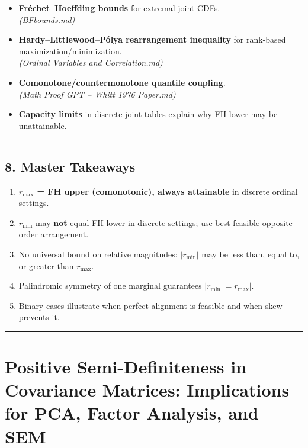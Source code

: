 \documentclass[
  letterpaper,
  DIV=11,
  numbers=noendperiod]{scrartcl}
\providecommand{\tightlist}{%
  \setlength{\itemsep}{0pt}\setlength{\parskip}{0pt}}
\theoremstyle{remark}
\begin{document}
\begin{itemize}
\tightlist
\item
  \textbf{Fréchet--Hoeffding bounds} for extremal joint CDFs.\\
  \emph{(BFbounds.md)}
\item
  \textbf{Hardy--Littlewood--Pólya rearrangement inequality} for
  rank-based maximization/minimization.\\
  \emph{(Ordinal Variables and Correlation.md)}
\item
  \textbf{Comonotone/countermonotone quantile coupling}.\\
  \emph{(Math Proof GPT -- Whitt 1976 Paper.md)}
\item
  \textbf{Capacity limits} in discrete joint tables explain why FH lower
  may be unattainable.
\end{itemize}

\begin{center}\rule{0.5\linewidth}{0.5pt}\end{center}

\subsection{8. Master Takeaways}\label{master-takeaways}

\begin{enumerate}
\def\labelenumi{\arabic{enumi}.}
\tightlist
\item
  \textbf{\(r_{\max}\) = FH upper (comonotonic), always attainable} in
  discrete ordinal settings.
\item
  \textbf{\(r_{\min}\)} may \textbf{not} equal FH lower in discrete
  settings; use best feasible opposite-order arrangement.
\item
  No universal bound on relative magnitudes: \(|r_{\min}|\) may be less
  than, equal to, or greater than \(r_{\max}\).
\item
  Palindromic symmetry of one marginal guarantees
  \(|r_{\min}| = r_{\max}|\).
\item
  Binary cases illustrate when perfect alignment is feasible and when
  skew prevents it.
\end{enumerate}

\begin{center}\rule{0.5\linewidth}{0.5pt}\end{center}

\newpage

\section{Positive Semi-Definiteness in Covariance Matrices: Implications
for PCA, Factor Analysis, and
SEM}\label{positive-semi-definiteness-in-covariance-matrices-implications-for-pca-factor-analysis-and-sem}
\end{document}
